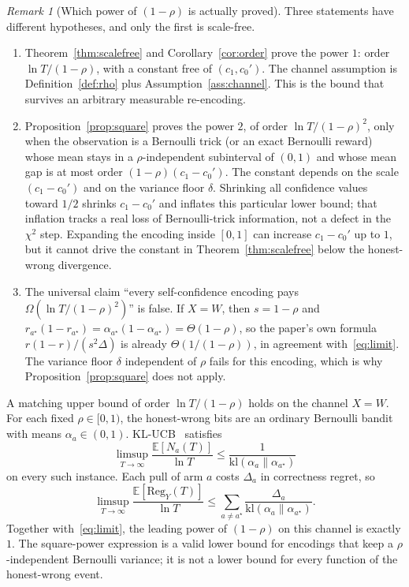 \documentclass{article}
\theoremstyle{definition}
\theoremstyle{remark}
\newtheorem{remark}[theorem]{Remark}
\newcommand{\E}{\mathbb{E}}
\newcommand{\kl}{\mathrm{kl}}
\newcommand{\Reg}{\mathrm{Reg}}
\begin{document}
\begin{remark}[Which power of $(1-\rho)$ is actually proved]\label{rem:power}
Three statements have different hypotheses, and only the first is scale-free.
\begin{enumerate}
\item Theorem~\ref{thm:scalefree} and Corollary~\ref{cor:order} prove the power $1$: order $\ln T/(1-\rho)$, with a constant free of $(c_1,c_0')$. The channel assumption is Definition~\ref{def:rho} plus Assumption~\ref{ass:channel}. This is the bound that survives an arbitrary measurable re-encoding.
\item Proposition~\ref{prop:square} proves the power $2$, of order $\ln T/(1-\rho)^2$, only when the observation is a Bernoulli trick (or an exact Bernoulli reward) whose mean stays in a $\rho$-independent subinterval of $(0,1)$ and whose mean gap is at most order $(1-\rho)(c_1-c_0')$. The constant depends on the scale $(c_1-c_0')$ and on the variance floor $\delta$. Shrinking all confidence values toward $1/2$ shrinks $c_1-c_0'$ and inflates this particular lower bound; that inflation tracks a real loss of Bernoulli-trick information, not a defect in the $\chi^2$ step. Expanding the encoding inside $[0,1]$ can increase $c_1-c_0'$ up to $1$, but it cannot drive the constant in Theorem~\ref{thm:scalefree} below the honest-wrong divergence.
\item The universal claim ``every self-confidence encoding pays $\Omega(\ln T/(1-\rho)^2)$'' is false. If $X=W$, then $s=1-\rho$ and $r_{a^\star}(1-r_{a^\star})=\alpha_{a^\star}(1-\alpha_{a^\star})=\Theta(1-\rho)$, so the paper's own formula $r(1-r)/(s^2\Delta)$ is already $\Theta(1/(1-\rho))$, in agreement with~\eqref{eq:limit}. The variance floor $\delta$ independent of $\rho$ fails for this encoding, which is why Proposition~\ref{prop:square} does not apply.
\end{enumerate}
A matching upper bound of order $\ln T/(1-\rho)$ holds on the channel $X=W$. For each fixed $\rho\in[0,1)$, the honest-wrong bits are an ordinary Bernoulli bandit with means $\alpha_a\in(0,1)$. KL-UCB~\cite{garivier2011} satisfies
\[
\limsup_{T\to\infty}\frac{\E[N_a(T)]}{\ln T}\le\frac{1}{\kl(\alpha_a\|\alpha_{a^\star})}
\]
on every such instance. Each pull of arm $a$ costs $\Delta_a$ in correctness regret, so
\[
\limsup_{T\to\infty}\frac{\E[\Reg_Y(T)]}{\ln T}
\le\sum_{a\neq a^\star}\frac{\Delta_a}{\kl(\alpha_a\|\alpha_{a^\star})}.
\]
Together with~\eqref{eq:limit}, the leading power of $(1-\rho)$ on this channel is exactly $1$. The square-power expression is a valid lower bound for encodings that keep a $\rho$-independent Bernoulli variance; it is not a lower bound for every function of the honest-wrong event.
\end{remark}
\end{document}
